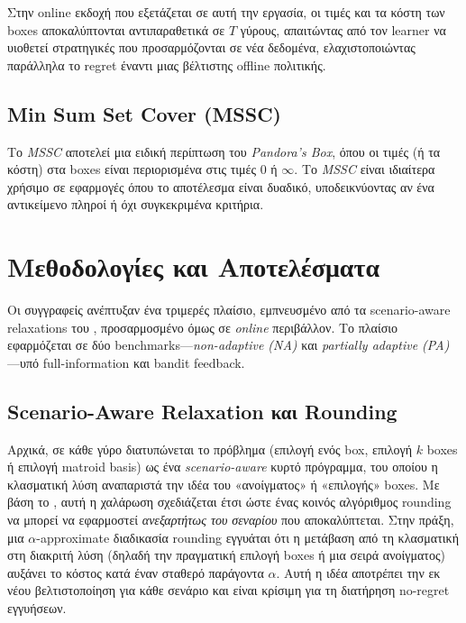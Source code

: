 \documentclass[11pt,a4paper]{article}
\begin{document}
Στην online εκδοχή που εξετάζεται σε αυτή την εργασία, οι τιμές και τα κόστη των boxes αποκαλύπτονται αντιπαραθετικά σε \( T \) γύρους, απαιτώντας από τον learner να υιοθετεί στρατηγικές που προσαρμόζονται σε νέα δεδομένα, ελαχιστοποιώντας παράλληλα το regret έναντι μιας βέλτιστης offline πολιτικής.

\subsection{Min Sum Set Cover (MSSC)}
Το \textit{MSSC} αποτελεί μια ειδική περίπτωση του \textit{Pandora’s Box}, όπου οι τιμές (ή τα κόστη) στα boxes είναι περιορισμένα στις τιμές \(0\) ή \(\infty\). Το \textit{MSSC} είναι ιδιαίτερα χρήσιμο σε εφαρμογές όπου το αποτέλεσμα είναι δυαδικό, υποδεικνύοντας αν ένα αντικείμενο πληροί ή όχι συγκεκριμένα κριτήρια.


\section{Μεθοδολογίες και Αποτελέσματα}
Οι συγγραφείς ανέπτυξαν ένα τριμερές πλαίσιο, εμπνευσμένο από τα scenario-aware relaxations του \cite{CGT+20}, προσαρμοσμένο όμως σε \emph{online} περιβάλλον. Το πλαίσιο εφαρμόζεται σε δύο benchmarks—\emph{non-adaptive (NA)} και \emph{partially adaptive (PA)}—υπό full-information και bandit feedback.

\subsection*{Scenario-Aware Relaxation και Rounding}
Αρχικά, σε κάθε γύρο διατυπώνεται το πρόβλημα (επιλογή ενός box, επιλογή $k$ boxes ή επιλογή matroid basis) ως ένα \emph{scenario-aware} κυρτό πρόγραμμα, του οποίου η κλασματική λύση αναπαριστά την ιδέα του «ανοίγματος» ή «επιλογής» boxes. Με βάση το \cite{CGT+20}, αυτή η χαλάρωση σχεδιάζεται έτσι ώστε ένας κοινός αλγόριθμος rounding να μπορεί να εφαρμοστεί \emph{ανεξαρτήτως του σεναρίου} που αποκαλύπτεται. Στην πράξη, μια $\alpha$-approximate διαδικασία rounding εγγυάται ότι η μετάβαση από τη κλασματική στη διακριτή λύση (δηλαδή την πραγματική επιλογή boxes ή μια σειρά ανοίγματος) αυξάνει το κόστος κατά έναν σταθερό παράγοντα \(\alpha\). Αυτή η ιδέα αποτρέπει την εκ νέου βελτιστοποίηση για κάθε σενάριο και είναι κρίσιμη για τη διατήρηση no-regret εγγυήσεων.
\end{document}
